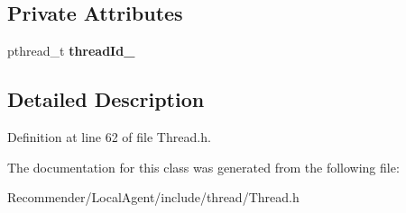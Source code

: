 \subsection*{Private Attributes}
\begin{CompactItemize}
\item 
pthread\_\-t {\bf threadId\_\-}\label{classbr_1_1ufscar_1_1lince_1_1ginga_1_1recommender_1_1Thread_4747430d8eda8cf31837d6a7529da957}

\end{CompactItemize}


\subsection{Detailed Description}




Definition at line 62 of file Thread.h.

The documentation for this class was generated from the following file:\begin{CompactItemize}
\item 
Recommender/LocalAgent/include/thread/Thread.h\end{CompactItemize}
